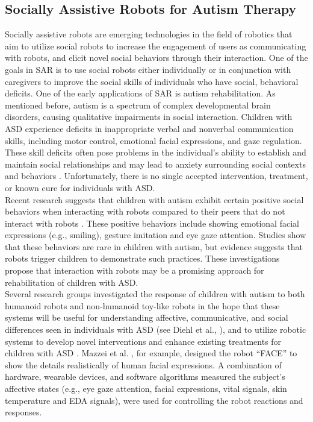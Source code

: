 \subsection{Socially Assistive Robots for Autism Therapy}
Socially assistive robots are emerging technologies in the field of robotics that aim
to utilize social robots to increase the engagement of users as communicating with robots, and
elicit novel social behaviors through their interaction. One of the goals in SAR is to use
social robots either individually or in conjunction with caregivers to improve the social skills
of individuals who have social, behavioral deficits. One of the early applications of SAR is
autism rehabilitation. As mentioned before, autism is a spectrum of complex
developmental brain disorders, causing qualitative impairments in social interaction.
Children with ASD experience deficits in inappropriate verbal and nonverbal communication
skills, including motor control, emotional facial expressions, and gaze regulation. These
skill deficits often pose problems in the individual’s ability to establish and maintain social
relationships and may lead to anxiety surrounding social contexts and behaviors \cite{wolff1964behavioural}.
Unfortunately, there is no single accepted intervention, treatment, or known cure for
individuals with ASD.\\

Recent research suggests that children with autism exhibit certain positive social
behaviors when interacting with robots compared to their peers that do not interact with
robots \cite{pierno2008robotic, villano2011domer, feil2005defining, fong2003survey}. 
These positive behaviors include showing emotional facial
expressions (e.g., smiling), gesture imitation and eye gaze attention. Studies show that
these behaviors are rare in children with autism, but evidence suggests that robots trigger
children to demonstrate such practices. These investigations propose that interaction with
robots may be a promising approach for rehabilitation of children with ASD.\\

Several research groups investigated the response of children with
autism to both humanoid robots and non-humanoid toy-like robots in the hope that these
systems will be useful for understanding affective, communicative, and social differences
seen in individuals with ASD (see Diehl et al., \cite{fong2003survey}), and to utilize robotic systems to develop
novel interventions and enhance existing treatments for children with ASD \cite{ASIMO2011, DSMIV2000, DoesMatter2006}.
Mazzei et al. \cite{dautenhahn2004towards}, for example, designed the robot “FACE” to show the details realistically
of human facial expressions. A combination of hardware, wearable devices, and software
algorithms measured the subject’s affective states (e.g., eye gaze attention, facial expressions, vital signals, 
skin temperature and EDA signals), were used for controlling the robot
reactions and responses.\\

